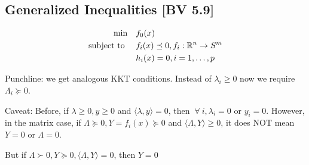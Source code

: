 \documentclass[class=article,crop=false]{standalone}
\begin{document}
\subsection{Generalized Inequalities [BV 5.9]}
\begin{align*}
\min\quad &f_0(x) \\
\text{subject to } \quad &f_i(x) \preceq 0, f_i:\mathbb{R}^{n} \to S^{m} \\
&h_i(x) = 0 , i = 1,\ldots,p
\end{align*}
\begin{eg}[SDP]
	Punchline: we get analogous KKT conditions. Instead of $ \lambda_i\geq 0$ now we require $ \Lambda_i \succeq 0$.

	Caveat: Before, if $ \lambda\geq 0, y \geq 0$ and $ \langle \lambda,y \rangle =0$, then $ \ \forall \ i, \lambda_i =0$ or $ y_i = 0$.
	However, in the matrix case, if $ \Lambda \succeq 0, Y=f_i(x) \succeq 0$ and $ \langle \Lambda,Y \rangle \geq 0$, it does NOT mean $ Y=0$ or  $ \Lambda =0$. 

	But if $ \Lambda \succ 0, Y \succeq 0, \langle \Lambda,Y \rangle = 0 $, then $ Y=0$
\end{eg}
\end{document}
